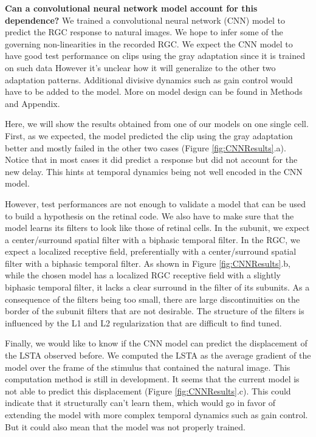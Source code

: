 \textbf{Can a convolutional neural network model account for this dependence?}
We trained a convolutional neural network (CNN) model to predict the RGC
response to natural images. We hope to infer some of the governing
non-linearities in the recorded RGC. We expect the CNN model to have
good test performance on clips using the gray adaptation since it is trained on
such data However it's unclear how it will generalize to the other two
adaptation patterns. Additional divisive dynamics such as gain control would
have to be added to the model. More on model design can be found in Methods and
Appendix.

Here, we will show the results obtained from one of our models on one single
cell.
First, as we expected, the model predicted the clip using the gray adaptation
better and mostly failed in the other two cases (Figure
\ref{fig:CNNResults}.a). Notice that in most cases it
did predict a response but did not account for the new delay.
This hints at temporal dynamics being not well encoded in the CNN model.

However, test performances are not enough to validate a model that can be used
to build a hypothesis on the retinal code. We also have to make sure that the
model learns its filters to look like those of retinal cells. In the subunit,
we expect a center/surround spatial filter with a biphasic temporal filter. In
the RGC, we expect a localized receptive field, preferentially with a
center/surround spatial filter with a biphasic temporal filter. As shown in
Figure \ref{fig:CNNResults}.b, while the chosen model has a localized RGC
receptive field
with a slightly biphasic temporal filter, it lacks a clear surround in the
filter
of its subunits. As a consequence of the filters being too small, there are
large discontinuities on the border of the subunit filters that are not
desirable.
The structure of the filters is influenced by the L1 and L2 regularization that
are difficult to find tuned.

Finally, we would like to know if the CNN model can predict the displacement of
the LSTA observed before. We computed the LSTA as the average gradient of the
model over the frame of the stimulus that contained the natural image. This computation method is still in development. It seems
that the current model is not able to predict this displacement (Figure
\ref{fig:CNNResults}.c). This could
indicate that it structurally can't learn them, which would go in favor of
extending the model with more complex temporal dynamics such as gain control.
But it could also mean that the model was not properly trained.

